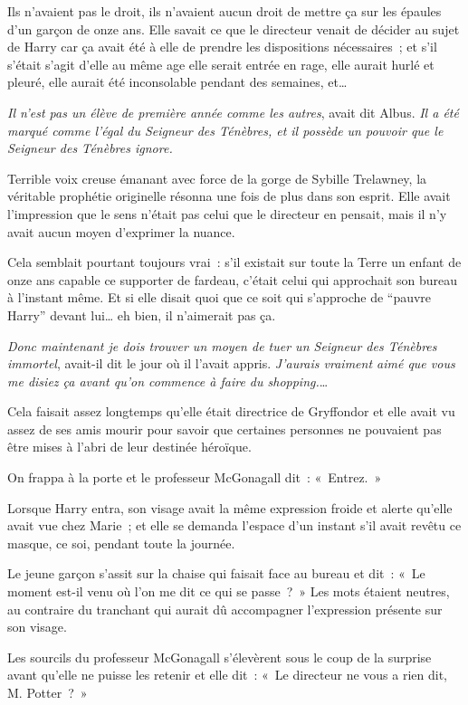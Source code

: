 Ils n'avaient pas le droit, ils n'avaient aucun droit de mettre ça sur les épaules d'un garçon de onze ans.
Elle savait ce que le directeur venait de décider au sujet de Harry car ça avait été à elle de prendre les dispositions nécessaires~; et s'il s'était s'agit d'elle au même age elle serait entrée en rage, elle aurait hurlé et pleuré, elle aurait été inconsolable pendant des semaines, et…

\emph{Il n'est pas un élève de première année comme les autres}, avait dit Albus.
\emph{Il a été marqué comme l'égal du Seigneur des Ténèbres, et il possède un pouvoir que le Seigneur des Ténèbres ignore.}

Terrible voix creuse émanant avec force de la gorge de Sybille Trelawney, la véritable prophétie originelle résonna une fois de plus dans son esprit.
Elle avait l'impression que le sens n'était pas celui que le directeur en pensait, mais il n’y avait aucun moyen d'exprimer la nuance.

Cela semblait pourtant toujours vrai~: s'il existait sur toute la Terre un enfant de onze ans capable ce supporter de fardeau, c'était celui qui approchait son bureau à l'instant même.
Et si elle disait quoi que ce soit qui s'approche de “pauvre Harry” devant lui… eh bien, il n'aimerait pas ça.

\emph{Donc maintenant je dois trouver un moyen de tuer un Seigneur des Ténèbres immortel}, avait-il dit le jour où il l'avait appris.
\emph{J'aurais vraiment aimé que vous me disiez ça avant qu'on commence à faire du shopping.}…

Cela faisait assez longtemps qu'elle était directrice de Gryffondor et elle avait vu assez de ses amis mourir pour savoir que certaines personnes ne pouvaient pas être mises à l'abri de leur destinée héroïque.

On frappa à la porte et le professeur McGonagall dit~: «~Entrez.~»

Lorsque Harry entra, son visage avait la même expression froide et alerte qu'elle avait vue chez Marie~; et elle se demanda l'espace d'un instant s'il avait revêtu ce masque, ce soi, pendant toute la journée.

Le jeune garçon s'assit sur la chaise qui faisait face au bureau et dit~: «~Le moment est-il venu où l'on me dit ce qui se passe~?~»
Les mots étaient neutres, au contraire du tranchant qui aurait dû accompagner l'expression présente sur son visage.

Les sourcils du professeur McGonagall s'élevèrent sous le coup de la surprise avant qu'elle ne puisse les retenir et elle dit~: «~Le directeur ne vous a rien dit, M. Potter~?~»

